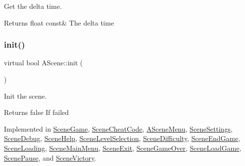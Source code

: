 Get the delta time. 

\begin{DoxyReturn}{Returns}
float const\& The delta time 
\end{DoxyReturn}
\mbox{\label{class_a_scene_ad431efa9c183182e8b5abb1bb8437a74}} 
\subsubsection{\texorpdfstring{init()}{init()}}
{\footnotesize\ttfamily virtual bool A\+Scene\+::init (\begin{DoxyParamCaption}{ }\end{DoxyParamCaption})\hspace{0.3cm}{\ttfamily [pure virtual]}}



Init the scene. 

\begin{DoxyReturn}{Returns}
false If failed 
\end{DoxyReturn}


Implemented in \hyperlink{class_scene_game_a841268ba3ea129f7c02cfafcafd32a4f}{Scene\+Game}, \hyperlink{class_scene_cheat_code_aa952941065350cdde0390695b32ac31d}{Scene\+Cheat\+Code}, \hyperlink{class_a_scene_menu_a78bdee98bd7df224524586a060f9bdec}{A\+Scene\+Menu}, \hyperlink{class_scene_settings_a19323950409add2d1b0df92799acf4d2}{Scene\+Settings}, \hyperlink{class_scene_debug_a4e413808e3d50dd29f9e1d07df4e6c4c}{Scene\+Debug}, \hyperlink{class_scene_help_adabf402b245092d311b08ec1139aa3c5}{Scene\+Help}, \hyperlink{class_scene_level_selection_ab6374f18220f26c22e062bfacc2ff962}{Scene\+Level\+Selection}, \hyperlink{class_scene_difficulty_a7fb9dd5ee9d623e346d917cd7a5db956}{Scene\+Difficulty}, \hyperlink{class_scene_end_game_a9503a63d52d2a11dbc56c97f35ff6eae}{Scene\+End\+Game}, \hyperlink{class_scene_loading_aa0463a9826f1b50e5980e41d57c80778}{Scene\+Loading}, \hyperlink{class_scene_main_menu_a11f68db49f9bf996efb0ce14913e5580}{Scene\+Main\+Menu}, \hyperlink{class_scene_exit_ad9168291bb031fee797a7964590e1b73}{Scene\+Exit}, \hyperlink{class_scene_game_over_a7ddd370503e10ff64e3d023f0a0acdb8}{Scene\+Game\+Over}, \hyperlink{class_scene_load_game_a4ef89351e679b7f681fa55e5f723dd16}{Scene\+Load\+Game}, \hyperlink{class_scene_pause_ae5e00c5fcd82e97985d93f918b9e4b35}{Scene\+Pause}, and \hyperlink{class_scene_victory_ab7dc4308732478fa13c8a3209f63e6b7}{Scene\+Victory}.

